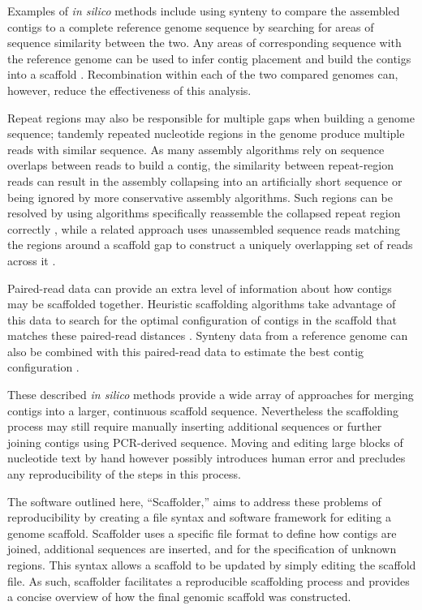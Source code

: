 \documentclass[10pt]{bmc_article}
\newenvironment{bmcformat}{\begin{raggedright}\baselineskip20pt\sloppy\setboolean{publ}{false}}{\end{raggedright}\baselineskip20pt\sloppy}
\begin{document}
\begin{bmcformat}
Examples of \emph{in silico} methods include using synteny to compare the
assembled contigs to a complete reference genome sequence by searching for
areas of sequence similarity between the two. Any areas of corresponding
sequence with the reference genome can be used to infer contig placement and
build the contigs into a scaffold \cite{richter2007,zhao2008,assefa2009}.
Recombination within each of the two compared genomes can, however, reduce the
effectiveness of this analysis. \pb

Repeat regions may also be responsible for multiple gaps when building
a genome sequence; tandemly repeated nucleotide regions in the genome produce
multiple reads with similar sequence. As many assembly algorithms rely on
sequence overlaps between reads to build a contig, the similarity between
repeat-region reads can result in the assembly collapsing into an artificially
short sequence or being ignored by more conservative assembly algorithms. Such
regions can be resolved by using algorithms specifically reassemble the
collapsed repeat region correctly \cite{mulyukov2002,koren2010}, while
a related approach uses unassembled sequence reads matching the regions around
a scaffold gap to construct a uniquely overlapping set of reads across it
\cite{tsai2010}. \pb

Paired-read data can provide an extra level of information about how contigs
may be scaffolded together. Heuristic scaffolding algorithms take advantage of
this data to search for the optimal configuration of contigs in the scaffold
that matches these paired-read distances \cite{dayarian2010,boetzer2011}.
Synteny data from a reference genome can also be combined with this
paired-read data to estimate the best contig configuration \cite{pop2004}. \pb

These described \emph{in silico} methods provide a wide array of approaches
for merging contigs into a larger, continuous scaffold sequence. Nevertheless
the scaffolding process may still require manually inserting additional
sequences or further joining contigs using PCR-derived sequence. Moving and
editing large blocks of nucleotide text by hand however possibly introduces
human error and precludes any reproducibility of the steps in this process. \pb

The software outlined here, ``Scaffolder,'' aims to address these problems of
reproducibility by creating a file syntax and software framework for editing
a genome scaffold. Scaffolder uses a specific file format to define how
contigs are joined, additional sequences are inserted, and for the
specification of unknown regions. This syntax allows a scaffold to be updated
by simply editing the scaffold file. As such, scaffolder facilitates
a reproducible scaffolding process and provides a concise overview of how the
final genomic scaffold was constructed. \pb


\end{bmcformat}
\end{document}
